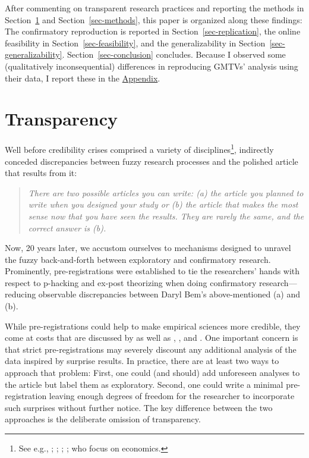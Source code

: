\documentclass[
  authoryear,
  review,
  3p,
  onecolumn]{elsarticle}
\begin{document}
After commenting on transparent research practices and reporting the
methods in Section~\ref{sec-transparency} and Section~\ref{sec-methods},
this paper is organized along these findings: The confirmatory
reproduction is reported in Section~\ref{sec-replication}, the online
feasibility in Section~\ref{sec-feasibility}, and the generalizability
in Section~\ref{sec-generalizability}. Section~\ref{sec-conclusion}
concludes. Because I observed some (qualitatively inconsequential)
differences in reproducing GMTVs' analysis using their data, I report
these in the \href{@sec-appendix}{Appendix}.

\hypertarget{sec-transparency}{%
\section{Transparency}\label{sec-transparency}}

Well before credibility crises comprised a variety of
disciplines\footnote{See e.g., \citet{CamererEtAl2016};
  \citet{BrodeurEtAl2016}; \citet{BrodeurEtAl2020};
  \citet{ChristensenMiguel2018}; \citet{FerraroShukla2020} who focus on
  economics.}, \citet[p.~2]{bemwriting} indirectly conceded
discrepancies between fuzzy research processes and the polished article
that results from it:

\begin{quote}
\emph{There are two possible articles you can write: (a) the article you
planned to write when you designed your study or (b) the article that
makes the most sense now that you have seen the results. They are rarely
the same, and the correct answer is (b).}
\end{quote}

Now, 20 years later, we accustom ourselves to mechanisms designed to
unravel the fuzzy back-and-forth between exploratory and confirmatory
research. Prominently, pre-registrations were established to tie the
researchers' hands with respect to p-hacking and ex-post theorizing when
doing confirmatory research---reducing observable discrepancies between
Daryl Bem's above-mentioned (a) and (b).

While pre-registrations could help to make empirical sciences more
credible, they come at costs that are discussed by \citet{Olken2015} as
well as \citet{Krishna2021}, \citet{SimmonsEtAl2021}, and
\citet{PhamEtAl2021}. One important concern is that strict
pre-registrations may severely discount any additional analysis of the
data inspired by surprise results. In practice, there are at least two
ways to approach that problem: First, one could (and should) add
unforeseen analyses to the article but label them as exploratory.
Second, one could write a minimal pre-registration leaving enough
degrees of freedom for the researcher to incorporate such surprises
without further notice. The key difference between the two approaches is
the deliberate omission of transparency.
\end{document}
